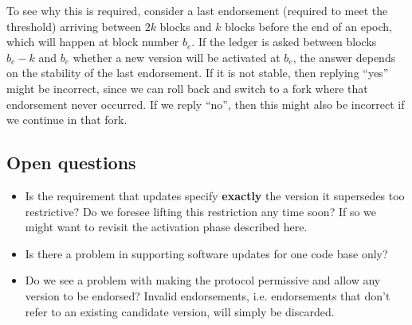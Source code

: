 To see why this is required, consider a last endorsement (required to meet the
threshold) arriving between $2k$ blocks and $k$ blocks before the end of an
epoch, which will happen at block number $b_e$. If the ledger is asked between
blocks $b_e - k$ and $b_e$ whether a new version will be activated at $b_e$, the
answer depends on the stability of the last endorsement. If it is not stable,
then replying ``yes'' might be incorrect, since we can roll back and switch to a
fork where that endorsement never occurred. If we reply ``no'', then this might
also be incorrect if we continue in that fork.

\subsection{Open questions}
\label{sec:open-questions}

\begin{itemize}
\item Is the requirement that updates specify \textbf{exactly} the version it
  supersedes too restrictive? Do we foresee lifting this restriction any time
  soon? If so we might want to revisit the activation phase described here.
\item Is there a problem in supporting software updates for one code base only?
\item Do we see a problem with making the protocol permissive and allow any
  version to be endorsed? Invalid endorsements, i.e. endorsements that don't
  refer to an existing candidate version, will simply be discarded.
\end{itemize}

